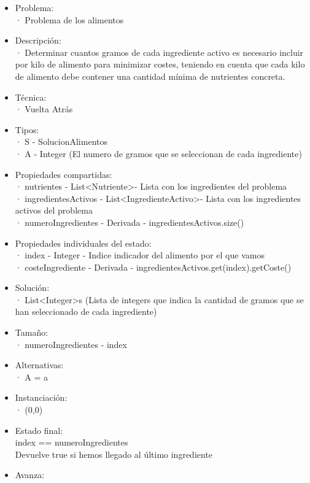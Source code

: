 \documentclass[a4paper,12pt]{article}
\begin{document}
\begin{itemize}

\item Problema: \\
      · Problema de los alimentos
\item Descripción: \\
· Determinar cuantos gramos de cada ingrediente activo es necesario incluir por kilo
de alimento para minimizar costes, teniendo en cuenta que cada kilo de alimento debe
contener una cantidad mínima de nutrientes concreta.
\item Técnica:\\
      · Vuelta Atrás
\item Tipos:\\
      · S - SolucionAlimentos\\
      · A - Integer \in [0,1000] (El numero de gramos que se seleccionan de cada ingrediente)
\item Propiedades compartidas:\\
      · nutrientes - List\textless Nutriente\textgreater - Lista con los ingredientes del problema\\
      · ingredientesActivos - List\textless IngredienteActivo\textgreater - Lista con los ingredientes activos del problema\\
      · numeroIngredientes - Derivada - ingredientesActivos.size()
\item Propiedades individuales del estado:\\
      · index - Integer - Indice indicador del alimento por el que vamos\\
      · costeIngrediente - Derivada - ingredientesActivos.get(index).getCoste()
\item Solución:\\
      · List\textless Integer\textgreater s (Lista de integers que indica la cantidad de gramos que se han seleccionado de cada ingrediente)
\item Tamaño:\\
      · numeroIngredientes - index
\item Alternativas:\\
      · A = {a \in [0,1000]}
\item Instanciación:\\
      · (0,0)
\item Estado final:\\
      index == numeroIngredientes \\Devuelve true si hemos llegado al último ingrediente
\item Avanza:\\

\end{itemize}
\end{document}
